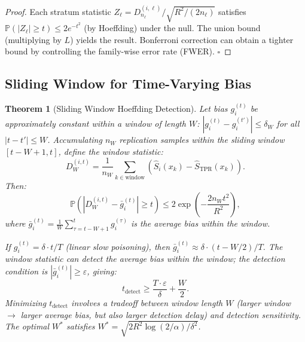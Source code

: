 \documentclass[11pt,a4paper]{article}
\newtheorem{theorem}{Theorem}[section]
\theoremstyle{definition}
\newcommand{\Prob}{\mathbb{P}}
\begin{document}
\begin{proof}
Each stratum statistic $Z_\ell = D_{n_\ell}^{(i,\ell)} / \sqrt{R^2/(2n_\ell)}$ satisfies $\Prob(|Z_\ell| \geq t) \leq 2e^{-t^2}$ (by Hoeffding) under the null. The union bound (multiplying by $L$) yields the result. Bonferroni correction can obtain a tighter bound by controlling the family-wise error rate (FWER). \hfill$\square$
\end{proof}

\subsection{Sliding Window for Time-Varying Bias}

\begin{theorem}[Sliding Window Hoeffding Detection]
\label{thm:sliding_window}
Let bias $g_i^{(t)}$ be approximately constant within a window of length $W$: $|g_i^{(t)} - g_i^{(t')}| \leq \delta_W$ for all $|t - t'| \leq W$. Accumulating $n_W$ replication samples within the sliding window $[t-W+1, t]$, define the window statistic:
\begin{equation}\label{eq:window_stat}
    D_W^{(i,t)} = \frac{1}{n_W} \sum_{k \in \text{window}} \left(\hat{S}_i(x_k) - \hat{S}_{\text{TPR}}(x_k)\right).
\end{equation}
Then:
\begin{equation}\label{eq:window_bound}
    \Prob\left(|D_W^{(i,t)} - \bar{g}_i^{(t)}| \geq t\right) \leq 2\exp\left(-\frac{2n_W t^2}{R^2}\right),
\end{equation}
where $\bar{g}_i^{(t)} = \frac{1}{W}\sum_{\tau=t-W+1}^{t} g_i^{(\tau)}$ is the average bias within the window.

If $g_i^{(t)} = \delta \cdot t/T$ (linear slow poisoning), then $\bar{g}_i^{(t)} \approx \delta \cdot (t - W/2)/T$. The window statistic can detect the average bias within the window; the detection condition is $|\bar{g}_i^{(t)}| \geq \varepsilon$, giving:
\begin{equation}\label{eq:slow_poison_detect}
    t_{\text{detect}} \geq \frac{T \cdot \varepsilon}{\delta} + \frac{W}{2}.
\end{equation}
Minimizing $t_{\text{detect}}$ involves a tradeoff between window length $W$ (larger window $\to$ larger average bias, but also larger detection delay) and detection sensitivity. The optimal $W^*$ satisfies $W^* = \sqrt{2 R^2 \log(2/\alpha) / \delta^2}$.
\end{theorem}
\end{document}
